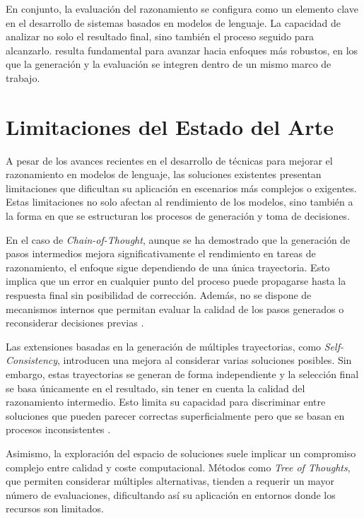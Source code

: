 \documentclass[12pt,a4paper,twoside,openright]{book}
\begin{document}
En conjunto, la evaluación del razonamiento se configura como un elemento clave en el desarrollo de sistemas basados en modelos de lenguaje. La capacidad de analizar no solo el resultado final, sino también el proceso seguido para alcanzarlo.
resulta fundamental para avanzar hacia enfoques más robustos, en los que la generación y la evaluación se integren dentro de un mismo marco de trabajo.



\section{Limitaciones del Estado del Arte}

A pesar de los avances recientes en el desarrollo de técnicas para mejorar el razonamiento en modelos de lenguaje, las soluciones existentes presentan limitaciones que dificultan su aplicación en escenarios más complejos o exigentes. Estas
limitaciones no solo afectan al rendimiento de los modelos, sino también a la forma en que se estructuran los procesos de generación y toma de decisiones.

En el caso de \emph{Chain-of-Thought}, aunque se ha demostrado que la generación de pasos intermedios mejora significativamente el rendimiento en tareas de razonamiento, el enfoque sigue dependiendo de una única trayectoria. Esto implica que un
error en cualquier punto del proceso puede propagarse hasta la respuesta final sin posibilidad de corrección. Además, no se dispone de mecanismos internos que permitan evaluar la calidad de los pasos generados o reconsiderar decisiones previas
\cite{wei2022chain}.

Las extensiones basadas en la generación de múltiples trayectorias, como \emph{Self-Consistency}, introducen una mejora al considerar varias soluciones posibles. Sin embargo, estas trayectorias se generan de forma independiente y la selección final
se basa únicamente en el resultado, sin tener en cuenta la calidad del razonamiento intermedio. Esto limita su capacidad para discriminar entre soluciones que pueden parecer correctas superficialmente pero que se basan en procesos
inconsistentes \cite{wang2022self}.

Asimismo, la exploración del espacio de soluciones suele implicar un compromiso complejo entre calidad y coste computacional. Métodos como \emph{Tree of Thoughts}, que permiten considerar múltiples alternativas, tienden a requerir un mayor
número de evaluaciones, dificultando así su aplicación en entornos donde los recursos son limitados.
\end{document}

